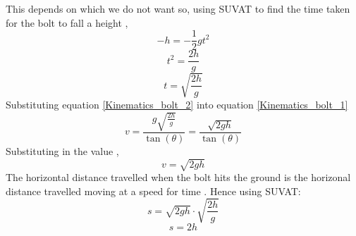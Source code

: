 \begin{problem}
{	This depends on  which we do not want so, using SUVAT to find the time taken for the bolt to fall a height ,
	\begin{equation*}-h=-\frac{1}{2}gt^2\end{equation*}
	\begin{equation*}t^2=\frac{2h}{g}\end{equation*}
	\begin{equation}\label{Kinematics_bolt_2}t=\sqrt{\frac{2h}{g}}\end{equation}
	Substituting equation \ref{Kinematics_bolt_2} into equation \ref{Kinematics_bolt_1}
	\begin{equation*}v=\frac{g\sqrt{\frac{2h}{g}}}{\tan(\theta)}=\frac{\sqrt{2gh}}{\tan(\theta)}\end{equation*}
	Substituting in the value \quantity{\theta}{45\sup{\circ}},
	\begin{equation*}v=\sqrt{2gh}\end{equation*}
	The horizontal distance travelled when the bolt hits the ground is  the horizonal distance travelled moving at a speed  for time . Hence using SUVAT:
	\begin{equation*}s=\sqrt{2gh}\cdot\sqrt{\frac{2h}{g}}\end{equation*}
	\begin{equation*}s=2h\end{equation*}
}
\end{problem}